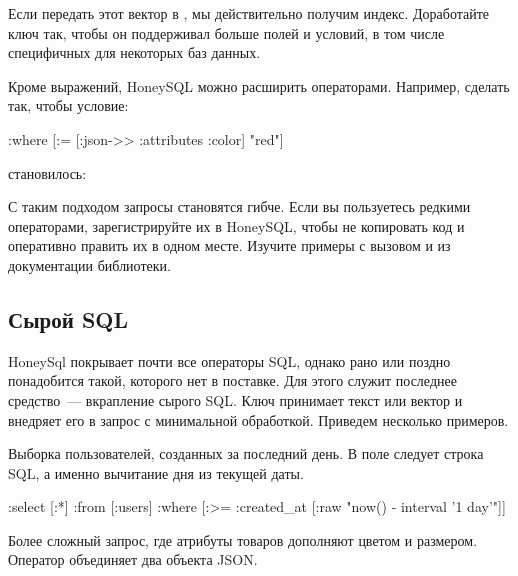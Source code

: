 Если передать этот вектор в , мы действительно получим индекс. Доработайте ключ  так, чтобы он поддерживал больше полей и условий, в том числе специфичных для некоторых баз данных.

Кроме выражений, HoneySQL можно расширить операторами. Например, сделать так, чтобы условие:

\begin{english}
  \begin{clojure}
{:where [:= [:json->> :attributes :color] "red"]}
  \end{clojure}
\end{english}

становилось:

\begin{english}
  \begin{clojure}
["... WHERE attributes ->> 'color' = ?" "red"]
  \end{clojure}
\end{english}

С таким подходом запросы становятся гибче. Если вы пользуетесь редкими операторами, зарегистрируйте их в HoneySQL, чтобы не копировать код и оперативно править их в одном месте. Изучите примеры с вызовом  и  из документации библиотеки.

\subsection{Сырой SQL}

HoneySql покрывает почти все операторы SQL, однако рано или поздно понадобится такой, которого нет в поставке. Для этого служит последнее средство~--- вкрапление сырого SQL. Ключ  принимает текст или вектор и внедряет его в запрос с минимальной обработкой. Приведем несколько примеров.

Выборка пользователей, созданных за последний день. В поле  следует строка SQL, а именно вычитание дня из текущей даты.

\begin{english}
  \begin{clojure}
{:select [:*]
 :from [:users]
 :where [:>= :created_at [:raw "now() - interval '1 day'"]]}
  \end{clojure}
\end{english}

Более сложный запрос, где атрибуты товаров дополняют цветом и размером. Оператор \code{||} объединяет два объекта JSON.

